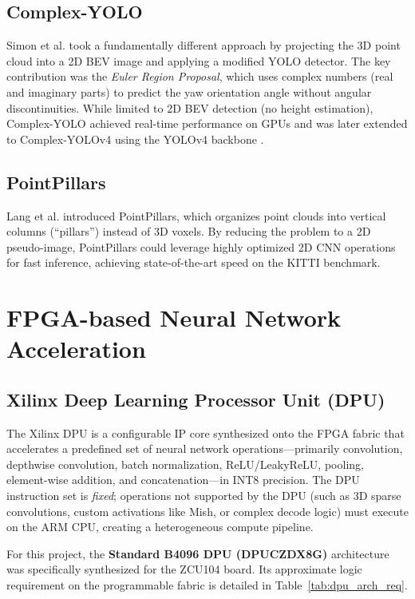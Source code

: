 \documentclass[12pt, a4paper]{report}
\begin{document}
\subsection{Complex-YOLO}
Simon et al. \cite{complexyolo2018} took a fundamentally different approach by projecting the 3D point cloud into a 2D BEV image and applying a modified YOLO detector. The key contribution was the \textit{Euler Region Proposal}, which uses complex numbers (real and imaginary parts) to predict the yaw orientation angle without angular discontinuities. While limited to 2D BEV detection (no height estimation), Complex-YOLO achieved real-time performance on GPUs and was later extended to Complex-YOLOv4 using the YOLOv4 backbone \cite{yolov4_2020}.

\subsection{PointPillars}
Lang et al. \cite{pointpillars2019} introduced PointPillars, which organizes point clouds into vertical columns (``pillars'') instead of 3D voxels. By reducing the problem to a 2D pseudo-image, PointPillars could leverage highly optimized 2D CNN operations for fast inference, achieving state-of-the-art speed on the KITTI benchmark.

\section{FPGA-based Neural Network Acceleration}

\subsection{Xilinx Deep Learning Processor Unit (DPU)}
The Xilinx DPU \cite{dpuczdx8g} is a configurable IP core synthesized onto the FPGA fabric that accelerates a predefined set of neural network operations---primarily convolution, depthwise convolution, batch normalization, ReLU/LeakyReLU, pooling, element-wise addition, and concatenation---in INT8 precision. The DPU instruction set is \textit{fixed}; operations not supported by the DPU (such as 3D sparse convolutions, custom activations like Mish, or complex decode logic) must execute on the ARM CPU, creating a heterogeneous compute pipeline.

For this project, the \textbf{Standard B4096 DPU (DPUCZDX8G)} architecture was specifically synthesized for the ZCU104 board. Its approximate logic requirement on the programmable fabric is detailed in Table~\ref{tab:dpu_arch_req}.
\end{document}
